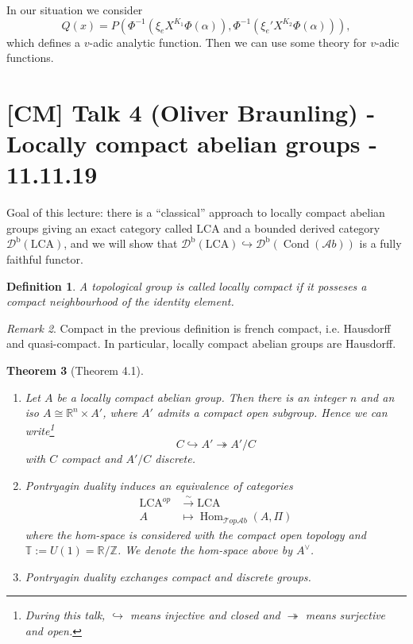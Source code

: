 \documentclass[12pt]{article}
\theoremstyle{darkgreentheorem}
\newtheorem{thm}{Theorem}[section]
\theoremstyle{darkbluedefinition}
\newtheorem{defn}[thm]{Definition}
\theoremstyle{darkredexample}
\theoremstyle{remark}
\newtheorem{rem}[thm]{Remark}
\newcommand{\Z}{\mathbb{Z}}
\newcommand{\R}{\mathbb{R}}
\newcommand{\1}{\mathbbm{1}}
\newcommand{\bbT}{\mathbb{T}}
\newcommand{\Top}{\mathscr{T}op}
\newcommand{\Ab}{\mathscr{A}b}
\newcommand{\Db}{\mathscr{D}^{\mathrm{b}}}
\DeclareMathOperator{\Hom}{Hom}
\DeclareMathOperator{\Cond}{Cond}
\newcommand{\dual}{^{\vee}}
\newcommand{\tms}{\times}
\newcommand{\epi}{\twoheadrightarrow}
\newcommand{\mono}{\hookrightarrow}
\newcommand{\LCA}{\mathrm{LCA}}
\begin{document}
In our situation we consider
\[ Q(x)=P(\Phi^{-1}(\xi_{e}X^{K_{1}}\Phi(\alpha)),\Phi^{-1}(\xi_{e}'X^{K_{2}}\Phi(\alpha))),\]
which defines a $v$-adic analytic function.
Then we can use some theory for $v$-adic functions.

\section{[CM] Talk 4 (Oliver Braunling) - Locally compact abelian groups - 11.11.19}

Goal of this lecture: there is a ``classical'' approach to locally compact abelian groups giving an exact category called $\LCA$ and a bounded derived category $\Db(\LCA)$, and we will show that $\Db(\LCA)\mono \Db(\Cond(\Ab))$ is a fully faithful functor.

\begin{defn}
    A topological group is called \textit{locally compact} if it posseses a compact neighbourhood of the identity element.
\end{defn}

\begin{rem}
    Compact in the previous definition is french compact, i.e. Hausdorff and quasi-compact.
    In particular, locally compact abelian groups are Hausdorff.
\end{rem}

\begin{thm}[Theorem 4.1]
    \begin{enumerate}[label=\roman*)]
	\item Let $A$ be a locally compact abelian group.
	    Then there is an integer $n$ and an iso $A\cong \R^{n}\tms A'$, where $A'$ admits a compact open subgroup.
	    Hence we can write\footnote{During this talk, $\mono$ means injective and closed and $\epi$ means surjective and open.}
	    \[ C\mono A'\epi A'/C \]
	    with $C$ compact and $A'/C$ discrete.
	\item Pontryagin duality induces an equivalence of categories
	    \begin{align*}
		\LCA^{op}&\xrightarrow{\sim} \LCA \\
		A & \mapsto \Hom_{\Top\Ab}(A,\Pi)
	    \end{align*}
	    where the hom-space is considered with the compact open topology and $\bbT:=U(1)=\R/\Z$.
	    We denote the hom-space above by $A\dual$.
	\item Pontryagin duality exchanges compact and discrete groups.
    \end{enumerate}
\end{thm}
\end{document}
